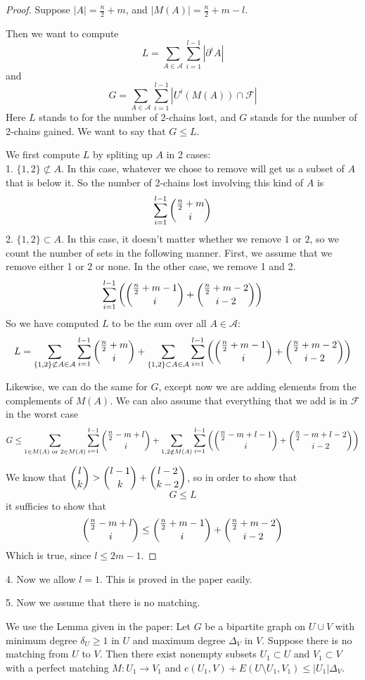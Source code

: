 \documentclass[11pt]{amsart}
\theoremstyle{definition}
\theoremstyle{remark}
\newcommand{\F}{\mathcal{F}}
\newcommand{\A}{\mathcal{A}}
\begin{document}
\begin{proof}
Suppose $|A| = \frac{n}{2} + m$, and $|M(A)| = \frac{n}{2} + m - l$.

Then we want to compute
\[L = \sum_{A \in \A} \sum_{i=1}^{l-1} |\partial^iA| \]
and 
\[G = \sum_{A \in \A} \sum_{i=1}^{l-1} |U^i(M(A)) \cap \F| \]
Here $L$ stands to for the number of 2-chains lost, and $G$ stands for the number of 2-chains gained. We want to say that $G \leq L$. 

We first compute $L$ by spliting up $A$ in 2 cases:\\
1. $\{ 1, 2 \} \not\subset A$. In this case, whatever we chose to remove will get us a subset of $A$ that is below it. So the number of 2-chains lost involving this kind of $A$ is
\[ \sum_{i=1}^{l-1} \dbinom{\frac{n}{2} + m}{i} \]
2. $\{ 1, 2 \} \subset A$. In this case, it doesn't matter whether we remove $1$ or $2$, so we count the number of sets in the following manner. First, we assume that we remove either 1 or 2 or none. In the other case, we remove 1 and 2.
\[ \sum_{i=1}^{l-1} \left(\dbinom{\frac{n}{2} + m - 1}{i} + \dbinom{\frac{n}{2}+m-2}{i-2} \right) \]
So we have computed $L$ to be the sum over all $A \in \A$:
\[ L = \sum_{\{1, 2\} \not\subset A \in \A} \sum_{i=1}^{l-1} \dbinom{\frac{n}{2} + m}{i} + \sum_{\{1, 2\} \subset A \in \A} \sum_{i=1}^{l-1} \left( \dbinom{\frac{n}{2}+m-1}{i} + \dbinom{\frac{n}{2}+m-2}{i-2}\right) \]

Likewise, we can do the same for $G$, except now we are adding elements from the complements of $M(A)$. We can also assume that everything that we add is in $\F$ in the worst case
\[ G \leq \sum_{1 \in M(A) \text{ or } 2 \in M(A)} \sum_{i=1}^{l-1} \dbinom{\frac{n}{2}-m+l}{i} + \sum_{1, 2 \notin M(A)} \sum_{i=1}^{l-1} \left( \dbinom{\frac{n}{2}-m+l-1}{i} + \dbinom{\frac{n}{2}-m+l-2}{i-2} \right) \]

We know that $\dbinom{l}{k} > \dbinom{l-1}{k} + \dbinom{l-2}{k-2}$, so in order to show that 
\[ G \leq L \]
it sufficies to show that
\[ \dbinom{\frac{n}{2}-m+l}{i} \leq \dbinom{\frac{n}{2}+m-1}{i} + \dbinom{\frac{n}{2}+m-2}{i-2} \]
Which is true, since $l \leq 2m-1$.
\end{proof}

4. Now we allow $l = 1$. This is proved in the paper easily. 

5. Now we assume that there is no matching.

We use the Lemma given in the paper: Let $G$ be a bipartite graph on $U \cup V$ with minimum degree $\delta_U \geq 1$ in $U$ and maximum degree $\Delta_V$ in $V$. Suppose there is no matching from $U$ to $V$. Then there exist nonempty subsets $U_1 \subset U$ and $V_1 \subset V$ with a perfect matching $M: U_1 \to V_1$ and $e(U_1,V) + E(U \setminus U_1,V_1) \leq |U_1|\Delta_V$.
\end{document}
